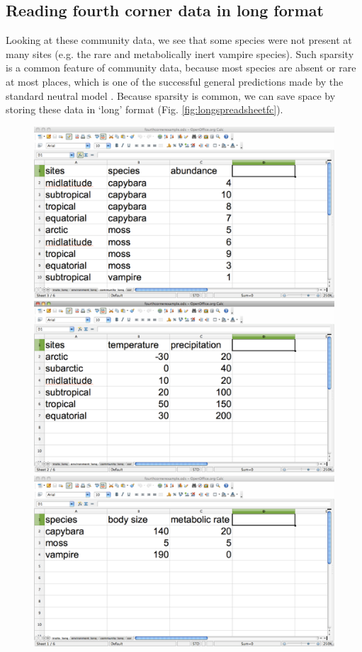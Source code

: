 \documentclass{article}
\numberwithin{exercise}{section}
\begin{document}
\subsection{Reading fourth corner data in long format}

Looking at these community data, we see that some species were not present at many sites (e.g. the rare and metabolically inert vampire species).  Such sparsity is a common feature of community data, because most species are absent or rare at most places, which is one of the successful general predictions made by the standard neutral model \citep{Hubbell2001}.  Because sparsity is common, we can save space by storing these data in `long' format (Fig. \ref{fig:longspreadsheetfc}). \begin{figure}
\includegraphics{./readingmultipletables/community_long.pdf}
\includegraphics{./readingmultipletables/environment_long.pdf}
\includegraphics{./readingmultipletables/traits_long.pdf}

\end{figure}
\end{document}
